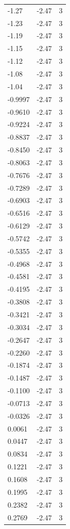\begin{longtable}{lrr}
  -1.27 & -2.47 & 3 \\
  -1.23 & -2.47 & 3 \\
  -1.19 & -2.47 & 3 \\
  -1.15 & -2.47 & 3 \\
  -1.12 & -2.47 & 3 \\
  -1.08 & -2.47 & 3 \\
  -1.04 & -2.47 & 3 \\
  -0.9997 & -2.47 & 3 \\
  -0.9610 & -2.47 & 3 \\
  -0.9224 & -2.47 & 3 \\
  -0.8837 & -2.47 & 3 \\
  -0.8450 & -2.47 & 3 \\
  -0.8063 & -2.47 & 3 \\
  -0.7676 & -2.47 & 3 \\
  -0.7289 & -2.47 & 3 \\
  -0.6903 & -2.47 & 3 \\
  -0.6516 & -2.47 & 3 \\
  -0.6129 & -2.47 & 3 \\
  -0.5742 & -2.47 & 3 \\
  -0.5355 & -2.47 & 3 \\
  -0.4968 & -2.47 & 3 \\
  -0.4581 & -2.47 & 3 \\
  -0.4195 & -2.47 & 3 \\
  -0.3808 & -2.47 & 3 \\
  -0.3421 & -2.47 & 3 \\
  -0.3034 & -2.47 & 3 \\
  -0.2647 & -2.47 & 3 \\
  -0.2260 & -2.47 & 3 \\
  -0.1874 & -2.47 & 3 \\
  -0.1487 & -2.47 & 3 \\
  -0.1100 & -2.47 & 3 \\
  -0.0713 & -2.47 & 3 \\
  -0.0326 & -2.47 & 3 \\
  0.0061 & -2.47 & 3 \\
  0.0447 & -2.47 & 3 \\
  0.0834 & -2.47 & 3 \\
  0.1221 & -2.47 & 3 \\
  0.1608 & -2.47 & 3 \\
  0.1995 & -2.47 & 3 \\
  0.2382 & -2.47 & 3 \\
  0.2769 & -2.47 & 3 \\

\end{longtable}
